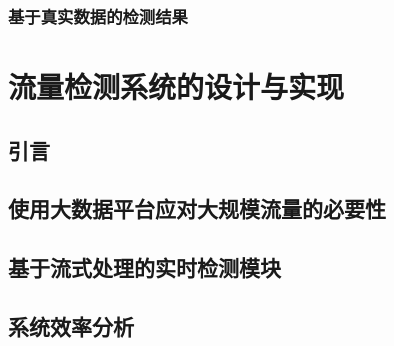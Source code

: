 
\subsection{基于真实数据的检测结果}

\chapter{流量检测系统的设计与实现}

\section{引言}

\section{使用大数据平台应对大规模流量的必要性}

\section{基于流式处理的实时检测模块}

\section{系统效率分析}
